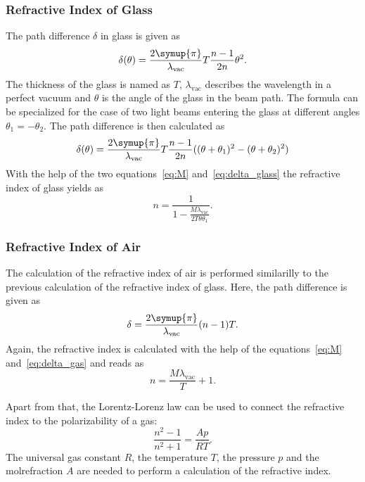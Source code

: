 \subsubsection{Refractive Index of Glass}
\label{sec:n_Glass}
The path difference $\delta$ in glass is given as
\begin{equation*}
    \delta(\theta) = \frac{2\symup{\pi}}{\lambda_{\text{vac}}}T\frac{n-1}{2n}\theta^2.
\end{equation*}
The thickness of the glass is named as $T$, $\lambda_{\text{vac}}$ describes the wavelength in a perfect vacuum and $\theta$ is the angle of the glass in the beam path.
The formula can be specialized for the case of two light beams entering the glass at different angles $\theta_1 = -\theta_2$. The path difference is then calculated as
\begin{equation}
    \delta(\theta) = \frac{2\symup{\pi}}{\lambda_{\text{vac}}}T\frac{n-1}{2n} ((\theta+\theta_1)^2 - (\theta+\theta_2)^2)
    \label{eq:delta_glass}
\end{equation}
With the help of the two equations~\eqref{eq:M} and~\eqref{eq:delta_glass} the refractive index of glass yields as
\begin{equation}
    n = \frac{1}{1-\frac{M\lambda_{\text{vac}}}{2T\theta \theta_1}}.
    \label{eq:n_Glass}
\end{equation}

\subsubsection{Refractive Index of Air}
\label{sec:n_Air}
The calculation of the refractive index of air is performed similarilly to the previous calculation of the refractive index of glass. Here, the path difference is
given as
\begin{equation}
    \delta = \frac{2\symup{\pi}}{\lambda_{\text{vac}}}(n-1)T.
    \label{eq:delta_gas}
\end{equation}
Again, the refractive index is calculated with the help of the equations~\eqref{eq:M} and~\eqref{eq:delta_gas} and reads as
\begin{equation}
    n = \frac{M\lambda_{\text{vac}}}{T} + 1.
    \label{eq:n_gas}
\end{equation}

Apart from that, the Lorentz-Lorenz law can be used to connect the refractive index to the polarizability of a gas:
\begin{equation}
    \frac{n^2-1}{n^2+1} = \frac{Ap}{RT}.
    \label{eq:LLL}
\end{equation}
The universal gas constant $R$, the temperature $T$, the pressure $p$ and the molrefraction $A$ are needed to perform a calculation of the refractive index.